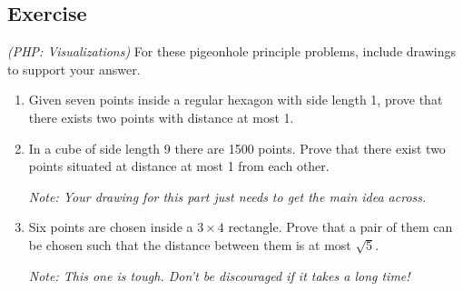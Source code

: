 \documentclass{article}
\newcounter{counter}
\newcommand{\Exercise}{Exercise \stepcounter{counter}\thecounter}
\begin{document}
\subsection*{\Exercise}
    \textit{(PHP: Visualizations)} For these pigeonhole principle problems, include drawings to support your answer.
    \begin{enumerate}
        \item Given seven points inside a regular hexagon with side length 1, prove that there exists two points with distance at most 1. 
        \item In a cube of side length 9 there are 1500 points. Prove that there exist two points situated at distance at most 1 from each other.
        
        \vspace{1mm} \textit{Note: Your drawing for this part just needs to get the main idea across.}
        \item Six points are chosen inside a $3 \times 4$ rectangle. Prove that a pair of them can be chosen such that the distance between them is at most $\sqrt{5}$.
        
        \vspace{1mm} \textit{Note: This one is tough. Don't be discouraged if it takes a long time!}
    \end{enumerate}
\end{document}
